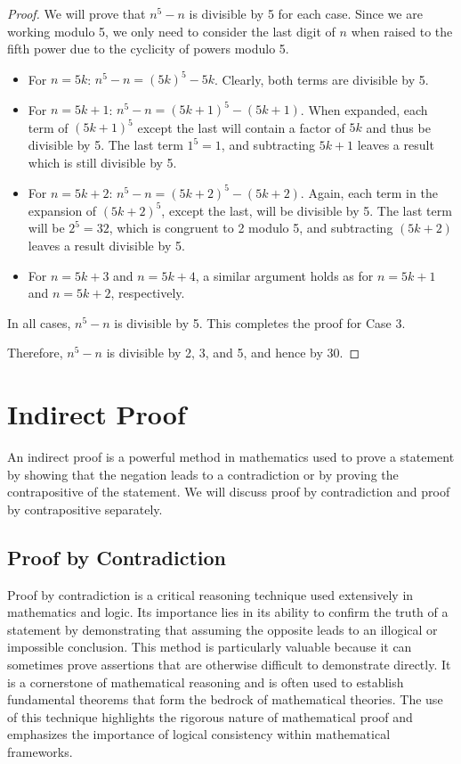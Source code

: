 \documentclass[
	12pt, %
	fleqn, %
	a4paper, %
]{LegrandOrangeBook}
\begin{document}
\begin{proof}
We will prove that \( n^5 - n \) is divisible by 5 for each case. Since we are working modulo 5, we only need to consider the last digit of \( n \) when raised to the fifth power due to the cyclicity of powers modulo 5.

\begin{itemize}
    \item For \( n = 5k \): \( n^5 - n = (5k)^5 - 5k \). Clearly, both terms are divisible by 5.
    \item For \( n = 5k + 1 \): \( n^5 - n = (5k + 1)^5 - (5k + 1) \). When expanded, each term of \( (5k + 1)^5 \) except the last will contain a factor of \( 5k \) and thus be divisible by 5. The last term \( 1^5 = 1 \), and subtracting \( 5k + 1 \) leaves a result which is still divisible by 5.
    \item For \( n = 5k + 2 \): \( n^5 - n = (5k + 2)^5 - (5k + 2) \). Again, each term in the expansion of \( (5k + 2)^5 \), except the last, will be divisible by 5. The last term will be \( 2^5 = 32 \), which is congruent to 2 modulo 5, and subtracting \( (5k + 2) \) leaves a result divisible by 5.
    \item For \( n = 5k + 3 \) and \( n = 5k + 4 \), a similar argument holds as for \( n = 5k + 1 \) and \( n = 5k + 2 \), respectively.
\end{itemize}

In all cases, \( n^5 - n \) is divisible by 5. This completes the proof for Case 3.

Therefore, \( n^5 - n \) is divisible by 2, 3, and 5, and hence by 30.
\end{proof}



\section{Indirect Proof}
    An indirect proof is a powerful method in mathematics used to prove a statement by showing that the negation leads to a contradiction or by proving the contrapositive of the statement. We will discuss proof by contradiction and proof by contrapositive separately.

\subsection{Proof by Contradiction}

Proof by contradiction is a critical reasoning technique used extensively in mathematics and logic. Its importance lies in its ability to confirm the truth of a statement by demonstrating that assuming the opposite leads to an illogical or impossible conclusion. This method is particularly valuable because it can sometimes prove assertions that are otherwise difficult to demonstrate directly. It is a cornerstone of mathematical reasoning and is often used to establish fundamental theorems that form the bedrock of mathematical theories. The use of this technique highlights the rigorous nature of mathematical proof and emphasizes the importance of logical consistency within mathematical frameworks.
\end{document}
